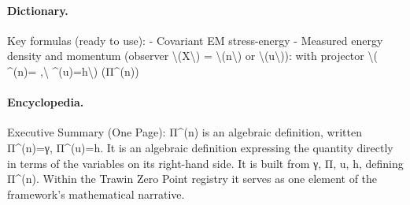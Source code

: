 \paragraph{Dictionary.}
Key formulas (ready to use): - Covariant EM stress-energy - Measured energy density and momentum (observer \textbackslash{}(X\textbackslash{}) = \textbackslash{}(n\textbackslash{}) or \textbackslash{}(u\textbackslash{})): with projector \textbackslash{}( \textasciicircum{}(n)= ,\textbackslash{} \textasciicircum{}(u)=h\textbackslash{}) (Π\textasciicircum{}(n))

\paragraph{Encyclopedia.}
Executive Summary (One Page): Π\textasciicircum{}(n) is an algebraic definition, written Π\textasciicircum{}(n)=γ, Π\textasciicircum{}(u)=h. It is an algebraic definition expressing the quantity directly in terms of the variables on its right-hand side. It is built from γ, Π, u, h, defining Π\textasciicircum{}(n). Within the Trawin Zero Point registry it serves as one element of the framework's mathematical narrative.
